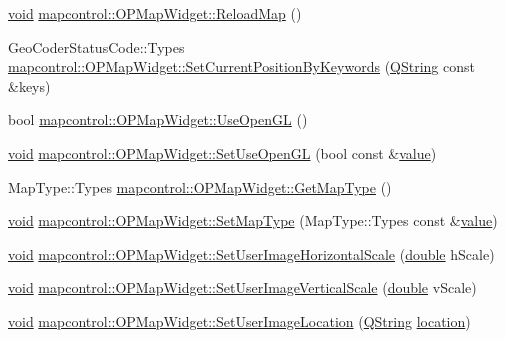 \begin{DoxyCompactItemize}
\item 
\hyperlink{group___u_a_v_objects_plugin_ga444cf2ff3f0ecbe028adce838d373f5c}{void} \hyperlink{group___o_p_map_widget_ga5281e4aae5ac664f9d4093735e6ced51}{mapcontrol\-::\-O\-P\-Map\-Widget\-::\-Reload\-Map} ()
\item 
Geo\-Coder\-Status\-Code\-::\-Types \hyperlink{group___o_p_map_widget_ga6dfd41d966be5940e4bb94dd36a25499}{mapcontrol\-::\-O\-P\-Map\-Widget\-::\-Set\-Current\-Position\-By\-Keywords} (\hyperlink{group___u_a_v_objects_plugin_gab9d252f49c333c94a72f97ce3105a32d}{Q\-String} const \&keys)
\item 
bool \hyperlink{group___o_p_map_widget_gafe684fbd6e3d76b2dbb9eeb2ffeab969}{mapcontrol\-::\-O\-P\-Map\-Widget\-::\-Use\-Open\-G\-L} ()
\item 
\hyperlink{group___u_a_v_objects_plugin_ga444cf2ff3f0ecbe028adce838d373f5c}{void} \hyperlink{group___o_p_map_widget_ga1dad00a9a3dc508690c7db4cb7b3373d}{mapcontrol\-::\-O\-P\-Map\-Widget\-::\-Set\-Use\-Open\-G\-L} (bool const \&\hyperlink{glext_8h_aa0e2e9cea7f208d28acda0480144beb0}{value})
\item 
Map\-Type\-::\-Types \hyperlink{group___o_p_map_widget_gaf5f079175bace819bcc168c5ea4bdb59}{mapcontrol\-::\-O\-P\-Map\-Widget\-::\-Get\-Map\-Type} ()
\item 
\hyperlink{group___u_a_v_objects_plugin_ga444cf2ff3f0ecbe028adce838d373f5c}{void} \hyperlink{group___o_p_map_widget_ga57d623773f3801edb2a359b9d92c648b}{mapcontrol\-::\-O\-P\-Map\-Widget\-::\-Set\-Map\-Type} (Map\-Type\-::\-Types const \&\hyperlink{glext_8h_aa0e2e9cea7f208d28acda0480144beb0}{value})
\item 
\hyperlink{group___u_a_v_objects_plugin_ga444cf2ff3f0ecbe028adce838d373f5c}{void} \hyperlink{group___o_p_map_widget_gad61028ad754a5341e96c7f2e0e8c13f0}{mapcontrol\-::\-O\-P\-Map\-Widget\-::\-Set\-User\-Image\-Horizontal\-Scale} (\hyperlink{_super_l_u_support_8h_a8956b2b9f49bf918deed98379d159ca7}{double} h\-Scale)
\item 
\hyperlink{group___u_a_v_objects_plugin_ga444cf2ff3f0ecbe028adce838d373f5c}{void} \hyperlink{group___o_p_map_widget_gaac2d5997b77a7b661f1d983316e4f825}{mapcontrol\-::\-O\-P\-Map\-Widget\-::\-Set\-User\-Image\-Vertical\-Scale} (\hyperlink{_super_l_u_support_8h_a8956b2b9f49bf918deed98379d159ca7}{double} v\-Scale)
\item 
\hyperlink{group___u_a_v_objects_plugin_ga444cf2ff3f0ecbe028adce838d373f5c}{void} \hyperlink{group___o_p_map_widget_gab46d43fc65b333d32a79056ca882caa0}{mapcontrol\-::\-O\-P\-Map\-Widget\-::\-Set\-User\-Image\-Location} (\hyperlink{group___u_a_v_objects_plugin_gab9d252f49c333c94a72f97ce3105a32d}{Q\-String} \hyperlink{glext_8h_a6f0165ed903f22b8bb600c3e0b628e73}{location})

\end{DoxyCompactItemize}

